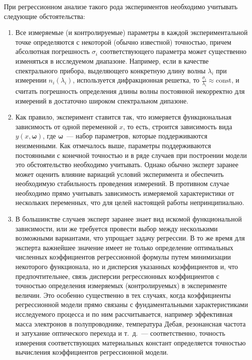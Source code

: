 \documentclass[11pt,a4paper]{article}
\theoremstyle{definition}
\begin{document}
При регрессионном анализе такого рода экспериментов необходимо
учитывать следующие обстоятельства:
\begin{enumerate}
  \item Все измеряемые (и контролируемые) параметры в каждой
	экспериментальной точке определяются с некоторой (обычно известной) 
	точностью, причем абсолютная погрешность $\sigma_i$ соответствующего параметра может
	существенно изменяться в исследуемом диапазоне. Например, если в качестве
	спектрального прибора, выделяющего конкретную длину волны $\lambda_i$ при
	измерении $n_i(\lambda_i)$, используется дифракционная решетка, то
	$\frac{\sigma_i}{\lambda_i} \approx \text{const}$, и
	считать погрешность определения длины волны постоянной некорректно для
	измерений в достаточно широком спектральном дипазоне.
  \item Как правило, эксперимент ставится так, что измеряется функциональная
	зависимость от одной переменной $x$, то есть, строится зависимость вида $y(x,
	\boldsymbol{\omega})$, где $\boldsymbol{\omega}$~--- набор параметров,
	которые поддерживаются неизменными. Как
	отмечалось выше, параметры поддерживаются постоянными с конечной
	точностью и в ряде случаев при построении модели это обстоятельство 
	необходимо учитывать. Однако обычно эксперт заранее может оценить
	влияние вариаций условий эксперимента и обеспечить необходимую
	стабильность проведения измерений. В противном случае необходимо прямо
	учитывать зависимость измеряемой характеристики от нескольких
	переменных, что для целей настоящей работы непринципиально.
  \item В большинстве случаев эксперт заранее знает вид
	искомой функциональной зависимости, или же требуется провести выбор
	между несколькими возможными вариантами, что упрощает задачу регрессии.
	В то же время для эксперта важнейшее значение имеет не только
	определение оптимальных численных коэффициентов регрессионной
	формулы путем минимизации некоторого функционала, но и дисперсия
	указанных коэффициентов и, что предпочтительнее, связь дисперсии
	регрессионных коэффициентов с точностью определения измеряемых
	(контролируемых) в эксперименте величин. Это особенно существенно в тех
	случаях, когда коэффициенты регрессионной модели прямо связаны с
	фундаментальными характеристиками исследуемого процесса и по ним
	рассчитывается, например эффективная масса электронов в полупроводнике,
	температура Дебая, резонансная частота и затухание оптического перехода и
	т.~д.~--- соответственно, точность измерения соответствующих материальных
	констант определяется точностью вычисления коэффициентов регрессионной
	модели.
\end{enumerate}
\end{document}
